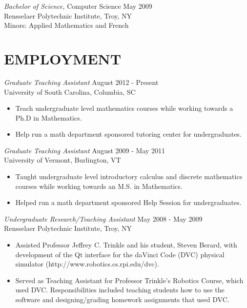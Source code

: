 \documentclass[line,overlapped]{res}
\begin{document}
\begin{resume}
          {\sl Bachelor of Science,} Computer Science \hfill May 2009\\
          Rensselaer Polytechnic Institute, Troy, NY\\
          Minors: Applied Mathematics and French
       
 \section{EMPLOYMENT}
         {\sl Graduate Teaching Assistant} \hfill August 2012 - Present \\
         University of South Carolina, Columbia, SC
         \begin{itemize}  \itemsep -2pt %
         \item
           Teach undergraduate level mathematics courses while working towards a Ph.D in Mathematics.
         \item 
           Help run a math department sponsored tutoring center for undergraduates.
         \end{itemize}
        
         {\sl Graduate Teaching Assistant} \hfill August 2009 - May 2011 \\
         University of Vermont, Burlington, VT
         \begin{itemize}  \itemsep -2pt %
         \item
           Taught undergraduate level introductory calculus and discrete mathematics courses while working towards an M.S. in Mathematics.
         \item 
           Helped run a math department sponsored Help Session for undergraduates.
         \end{itemize}

         {\sl Undergraduate Research/Teaching Assistant} \hfill May 2008 - May 2009 \\
         Rensselaer Polytechnic Institute, Troy, NY
         \begin{itemize}  \itemsep -2pt %
         \item Assisted Professor Jeffrey C. Trinkle and his student, Steven Berard, with development of the Qt interface for the daVinci Code (DVC) physical simulator (http://www.robotics.cs.rpi.edu/dvc).
         \item Served as Teaching Assistant for Professor Trinkle's Robotics Course, which used DVC.
           Responsibilities included teaching students how to use the software and designing/grading homework assignments that used DVC.
         \end{itemize}


\end{resume}
\end{document}
